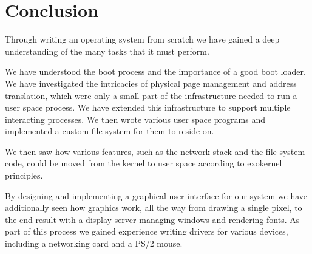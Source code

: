 \documentclass{report}
\begin{document}


% 

\chapter{Conclusion}
Through writing an operating system from scratch we have gained a deep
understanding of the many tasks that it must perform. 

We have understood the boot process and the importance of a good boot loader.
We have investigated the intricacies of physical page management and address
translation, which were only a small part of the infrastructure needed to run
a user space process. We have extended this infrastructure to support multiple
interacting processes. We then wrote various user space programs and
implemented a custom file system for them to reside on.  

We then saw how various features, such as the network stack and the file
system code, could be moved from the kernel to user space according to exokernel
principles.

By designing and implementing a graphical user interface for our system we
have additionally seen how graphics work, all the way from drawing a single
pixel, to the end result with a display server managing
windows and rendering fonts. As part of this process we gained experience
writing drivers for various devices, including a networking card and a PS/2
mouse.
\end{document}
